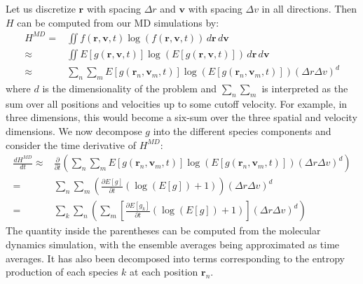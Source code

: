 \documentclass{article}
\begin{document}
Let us discretize $\mathbf{r}$ with spacing $\Delta r$ and $\mathbf{v}$ with spacing $\Delta v$ in all directions. Then $H$ can be computed from our MD simulations by:
\begin{align*}
H^{MD}=&\iint f(\mathbf{r},\mathbf{v},t)\log(f(\mathbf{r},\mathbf{v},t))\,d\mathbf{r}\,d\mathbf{v}\\
\approx&\iint E[g(\mathbf{r},\mathbf{v},t)]\log(E[g(\mathbf{r},\mathbf{v},t)])\,d\mathbf{r}\,d\mathbf{v}\\
\approx&\sum_n\sum_m E[g(\mathbf{r}_n,\mathbf{v}_m,t)]\log(E[g(\mathbf{r}_n,\mathbf{v}_m,t)])(\Delta r\Delta v)^d
\end{align*}
where $d$ is the dimensionality of the problem and $\sum_n\sum_m$ is interpreted as the sum over all positions and velocities up to some cutoff velocity. For example, in three dimensions, this would become a six-sum over the three spatial and velocity dimensions. We now decompose $g$ into the different species components and consider the time derivative of $H^{MD}$:
\begin{align*}
\frac{d H^{MD}}{d t}\approx&\frac{\partial }{\partial t}\left(\sum_n\sum_m E[g(\mathbf{r}_n,\mathbf{v}_m,t)]\log(E[g(\mathbf{r}_n,\mathbf{v}_m,t)])(\Delta r\Delta v)^d\right)\\
=& \sum_n\sum_m \left(\frac{\partial E[g]}{\partial t}\left(\log(E[g])+1\right)\right)(\Delta r\Delta v)^d\\
=&\sum_k\sum_n\left(\sum_m\left[\frac{\partial E[g_k]}{\partial t}\left(\log(E[g])+1\right)\right](\Delta r\Delta v)^d\right)
\end{align*}
The quantity inside the parentheses can be computed from the molecular dynamics simulation, with the ensemble averages being approximated as time averages. It has also been decomposed into terms corresponding to the entropy production of each species $k$ at each position $\mathbf{r}_n$.
\end{document}
